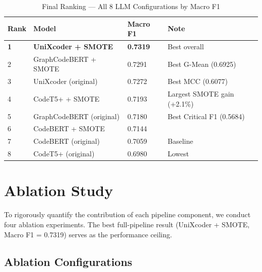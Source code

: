 \documentclass[12pt, a4paper]{report}
\begin{document}
\begin{table}[H]
\centering
\caption{Final Ranking --- All 8 LLM Configurations by Macro F1}
\label{tab:final_ranking}
\begin{tabular}{C{1cm} L{5cm} C{2.5cm} L{4cm}}
\toprule
\textbf{Rank} & \textbf{Model} & \textbf{Macro F1} & \textbf{Note} \\
\midrule
\textbf{1} & \textbf{UniXcoder + SMOTE}  & \textbf{0.7319} & Best overall \\
2          & GraphCodeBERT + SMOTE        & 0.7291           & Best G-Mean (0.6925) \\
3          & UniXcoder (original)         & 0.7272           & Best MCC (0.6077) \\
4          & CodeT5+ + SMOTE              & 0.7193           & Largest SMOTE gain (+2.1\%) \\
5          & GraphCodeBERT (original)     & 0.7180           & Best Critical F1 (0.5684) \\
6          & CodeBERT + SMOTE             & 0.7144           & \\
7          & CodeBERT (original)          & 0.7059           & Baseline \\
8          & CodeT5+ (original)           & 0.6980           & Lowest \\
\bottomrule
\end{tabular}
\end{table}

\clearpage
\chapter{Ablation Study}

To rigorously quantify the contribution of each pipeline component, we conduct four ablation experiments. The best full-pipeline result (UniXcoder + SMOTE, Macro F1 = 0.7319) serves as the performance ceiling.

\section{Ablation Configurations}
\end{document}
